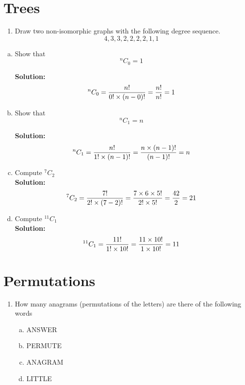 \section*{Trees}
\begin{enumerate}
\item Draw two non-isomorphic graphs with the following degree sequence.
\[ 4,3,3,2,2,2,2,1,1\]
\end{enumerate}

\begin{enumerate}[(a)]
\item 	Show that
	\[ ^{n}C_0  = 1 \]
	
	\textbf{Solution: }
	\[ ^{n}C_0  = {n! \over 0!  \times (n-0)!} =  {n! \over n!} = 1 \]
	

\item 
	Show that
	\[ ^{n}C_1  = n \]
	
	\textbf{Solution: }
	\[ ^{n}C_1  = {n! \over 1!  \times (n-1)!} =  {n \times (n-1)! \over (n-1)!} = n \]
	


\item 	Compute $ ^{7}C_2  $\\
	
	\textbf{Solution: }
	\[ ^{7}C_2  = {7! \over 2!  \times (7-2)!} =  {7 \times 6 \times 5! \over 2! \times 5!} = {42 \over 2} =21  \]
	

\item Compute $ ^{11}C_1  $\\
	
	\textbf{Solution: }
	\[ ^{11}C_1  = {11! \over 1!  \times 10!} =  {11 \times 10! \over 1 \times 10!} = 11 \]
	
\end{enumerate}	
	
\section*{Permutations}

\begin{enumerate}
    \item How many anagrams (permutations of the letters) are there of the following words
\begin{enumerate}[(a)]
\item ANSWER
\item PERMUTE
\item ANAGRAM
\item LITTLE
\end{enumerate}

\end{enumerate}

